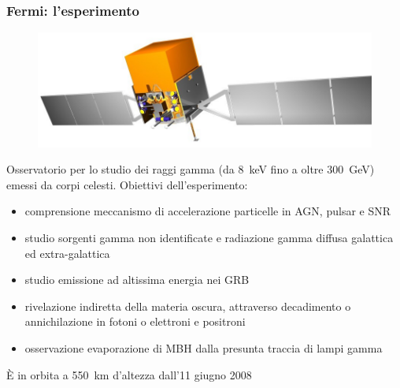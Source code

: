 \documentclass[10pt]{beamer}
\begin{document}
\begin{frame}
  \frametitle{Fermi: l'esperimento}
  \begin{figure}
    \centering
    \includegraphics[width=0.5\columnwidth]{glast.jpg}
  \end{figure}
  Osservatorio per lo studio dei raggi gamma (da \SI{8}{\kilo\electronvolt} fino
  a oltre \SI{300}{\giga\electronvolt}) emessi da corpi celesti.  Obiettivi
  dell'esperimento:
  \begin{itemize}
  \item comprensione \alert{meccanismo di accelerazione particelle} in AGN,
    pulsar e SNR
  \item studio \alert{sorgenti gamma non identificate} e
    \alert{radiazione gamma diffusa} galattica ed extra-galattica
  \item studio \alert{emissione ad altissima energia} nei GRB
  \item rivelazione indiretta della \alert{materia oscura}, attraverso
    decadimento o annichilazione in fotoni o elettroni e positroni
  \item osservazione \alert{evaporazione di MBH} dalla presunta traccia di lampi
    gamma
  \end{itemize}
  È in orbita a \SI{550}{\kilo\metre} d'altezza dall'11 giugno 2008
\end{frame}
\end{document}
